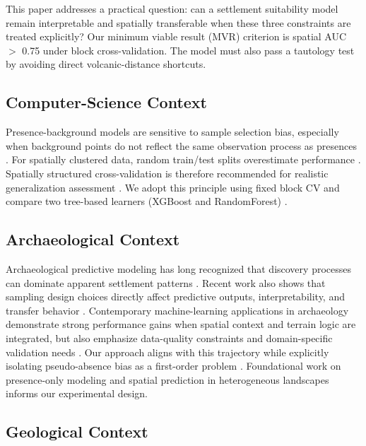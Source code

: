 \documentclass[12pt]{article}
\begin{document}
This paper addresses a practical question: can a settlement suitability model remain interpretable and spatially transferable when these three constraints are treated explicitly?
Our minimum viable result (MVR) criterion is spatial AUC $>$ 0.75 under block cross-validation.
The model must also pass a tautology test by avoiding direct volcanic-distance shortcuts.

\subsection{Computer-Science Context}

Presence-background models are sensitive to sample selection bias, especially when background points do not reflect the same observation process as presences \citep{phillips2009, elith2006, araujo2006}.
For spatially clustered data, random train/test splits overestimate performance \citep{kohavi1995}.
Spatially structured cross-validation is therefore recommended for realistic generalization assessment \citep{roberts2017, valavi2019}.
We adopt this principle using fixed block CV and compare two tree-based learners (XGBoost and RandomForest) \citep{chen2016, breiman2001}.

\subsection{Archaeological Context}

Archaeological predictive modeling has long recognized that discovery processes can dominate apparent settlement patterns \citep{verhagen2012, kamermans2019, verhagen2020}.
Recent work also shows that sampling design choices directly affect predictive outputs, interpretability, and transfer behavior \citep{comer2023}.
Contemporary machine-learning applications in archaeology demonstrate strong performance gains when spatial context and terrain logic are integrated, but also emphasize data-quality constraints and domain-specific validation needs \citep{castiello2021, wang2023}.
Our approach aligns with this trajectory while explicitly isolating pseudo-absence bias as a first-order problem \citep{barbet2012, senay2013, wisz2009, lobo2010}.
Foundational work on presence-only modeling \citep{phillips2006, kvamme2006} and spatial prediction in heterogeneous landscapes \citep{nuninger2016, araujo2005} informs our experimental design.

\subsection{Geological Context}
\end{document}
